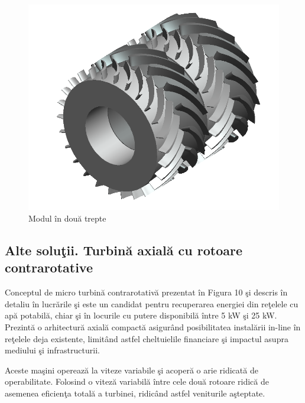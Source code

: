 \begin{figure}[h!]
	\centering
	\includegraphics[scale=0.6]{figures/modul_in_doua_trepte.png}
	\caption{Modul \^{i}n dou\u{a} trepte \cite{susanhub}}
	\label{Modul \^{i}n dou\u{a} trepte}
\end{figure}



\subsection{Alte solu\c{t}ii. Turbin\u{a} axial\u{a} cu rotoare contrarotative}

Conceptul de micro turbin\u{a} contrarotativ\u{a} prezentat \^{i}n Figura 10 \c{s}i descris \^{i}n detaliu \^{i}n lucr\u{a}rile \cite{andolfatto2016simulation} \c{s}i \cite{andolfatto2015mixed} este un candidat pentru recuperarea energiei din re\c{t}elele cu ap\u{a} potabil\u{a}, chiar \c{s}i \^{i}n locurile cu putere disponibil\u{a} \^{i}ntre 5 kW \c{s}i 25 kW. Prezint\u{a} o arhitectur\u{a} axial\u{a} compact\u{a} asigur\^{a}nd posibilitatea instal\u{a}rii in-line \^{i}n re\c{t}elele deja existente, limit\^{a}nd astfel cheltuielile financiare \c{s}i impactul asupra mediului \c{s}i infrastructurii.

Aceste ma\c{s}ini opereaz\u{a} la viteze variabile \c{s}i acoper\u{a} o arie ridicat\u{a} de operabilitate. Folosind o vitez\u{a} variabil\u{a} \^{i}ntre cele dou\u{a} rotoare ridic\u{a} de asemenea eficien\c{t}a total\u{a} a turbinei, ridic\^{a}nd astfel veniturile a\c{s}teptate.

